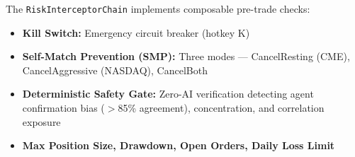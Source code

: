 \documentclass[11pt]{article}
\theoremstyle{definition}
\begin{document}
The \texttt{RiskInterceptorChain} implements composable pre-trade
checks:
\begin{itemize}[leftmargin=*,topsep=2pt,itemsep=1pt]
  \item \textbf{Kill Switch:} Emergency circuit breaker (hotkey K)
  \item \textbf{Self-Match Prevention (SMP):} Three modes ---
        CancelResting (CME), CancelAggressive (NASDAQ), CancelBoth
  \item \textbf{Deterministic Safety Gate:} Zero-AI verification
        detecting agent confirmation bias ($>$85\% agreement),
        concentration, and correlation exposure
  \item \textbf{Max Position Size, Drawdown, Open Orders, Daily Loss
        Limit}
\end{itemize}
\end{document}
